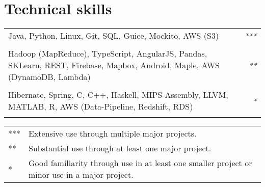 \documentclass[11pt,a4paper]{article}
\begin{document}

\midrule
\section*{Technical skills}
\begin{tabularx}{\textwidth}{X r}
    Java, Python, Linux, Git, SQL, Guice, Mockito, AWS (S3)
    & \textit{***} \\\\

    Hadoop (MapReduce), TypeScript, AngularJS, Pandas, SKLearn, REST, Firebase, Mapbox, Android, Maple, AWS (DynamoDB, Lambda)
    & \textit{**} \\\\

    Hibernate, Spring, C, C++, Haskell, MIPS-Assembly, LLVM, MATLAB, R, AWS (Data-Pipeline, Redshift, RDS)
    & \textit{*} \\\\
\end{tabularx}
\begin{tiny}{}
\begin{tabular}{l l}
    *** & Extensive use through multiple major projects. \\
    ** & Substantial use through at least one major project. \\
    * & Good familiarity through use in at least one smaller project or minor use in a major project.
\end{tabular}
\end{tiny}


\end{document}
